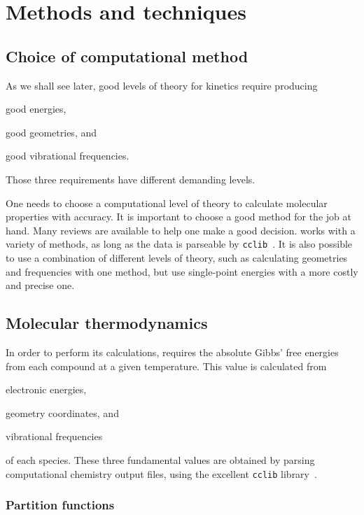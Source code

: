 \chapter{Methods and techniques}%
\label{ch:methods}

\section{Choice of computational method}

As we shall see later,
good levels of theory for kinetics
require producing
\begin{enumerate*}
	\item good energies,
	\item good geometries, and
	\item good vibrational frequencies.
\end{enumerate*}
Those three requirements have different demanding levels.

One needs to choose a computational level of theory to calculate
molecular properties with accuracy.
It is important to choose a good method for the job at hand.
Many reviews are available to help one make a good decision.
\overreact{} works with a variety of methods, as long as the data is parseable by \texttt{cclib}~\cite{O_boyle_2008}.
It is also possible to use a combination of different levels of theory,
such as calculating geometries and frequencies with one method,
but use single-point energies with a more costly and precise one.

\section{Molecular thermodynamics}

In order to perform its calculations,
\overreact{} requires the absolute Gibbs' free energies from each compound at a given temperature.
This value is calculated from
\begin{enumerate*}
	\item electronic energies,
	\item geometry coordinates, and
	\item vibrational frequencies
\end{enumerate*}
of each species.
These three fundamental values are obtained
by parsing computational chemistry output files,
using the excellent \texttt{cclib} library~\cite{O_boyle_2008}.

\subsection{Partition functions}

